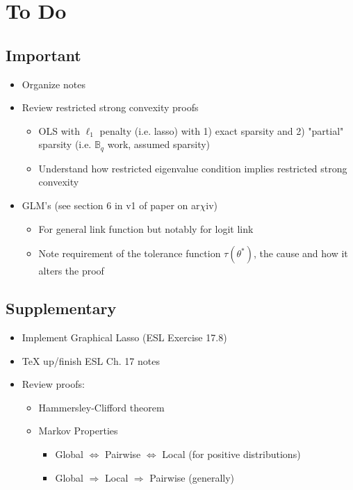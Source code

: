 \documentclass[11pt]{article}
\begin{document}
\newpage 

\section*{To Do}

\subsection*{Important}

\begin{itemize}
    \item Organize notes
    \item Review restricted strong convexity proofs 
    \begin{itemize}
        \item OLS with $\ell_1$ penalty (i.e. lasso) with 1) exact sparsity and 2) "partial" sparsity (i.e. $\mathbb{B}_q$ work, assumed sparsity)
        \item Understand how restricted eigenvalue condition implies restricted strong convexity 
    \end{itemize}
    \item GLM's (see section 6 in v1 of paper on ar$\chi$iv)
    \begin{itemize}
        \item For general link function but notably for logit link
        \item Note requirement of the tolerance function $\tau(\theta^*)$, the cause and how it alters the proof 
    \end{itemize}
\end{itemize}


\subsection*{Supplementary}

\begin{itemize}
    \item Implement Graphical Lasso (ESL Exercise 17.8)
    \item TeX up/finish ESL Ch. 17 notes 
    \item Review proofs:
    \begin{itemize}
    	\item Hammersley-Clifford theorem
	    \item Markov Properties  
        \begin{itemize}
            \item Global $\Leftrightarrow$ Pairwise $\Leftrightarrow$ Local (for positive distributions)
            \item Global $\Rightarrow$ Local $\Rightarrow$ Pairwise (generally)
        \end{itemize}
    \end{itemize}
\end{itemize}
\end{document}
